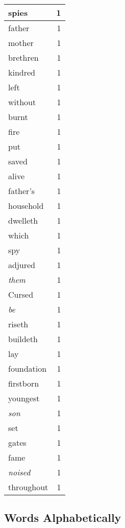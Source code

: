 \begin{center}
\begin{longtable}{l|r}
spies & 1 \\ \hline
father & 1 \\ \hline
mother & 1 \\ \hline
brethren & 1 \\ \hline
kindred & 1 \\ \hline
left & 1 \\ \hline
without & 1 \\ \hline
burnt & 1 \\ \hline
fire & 1 \\ \hline
put & 1 \\ \hline
saved & 1 \\ \hline
alive & 1 \\ \hline
father's & 1 \\ \hline
household & 1 \\ \hline
dwelleth & 1 \\ \hline
which & 1 \\ \hline
spy & 1 \\ \hline
adjured & 1 \\ \hline
\emph{them} & 1 \\ \hline
Cursed & 1 \\ \hline
\emph{be} & 1 \\ \hline
riseth & 1 \\ \hline
buildeth & 1 \\ \hline
lay & 1 \\ \hline
foundation & 1 \\ \hline
firstborn & 1 \\ \hline
youngest & 1 \\ \hline
\emph{son} & 1 \\ \hline
set & 1 \\ \hline
gates & 1 \\ \hline
fame & 1 \\ \hline
\emph{noised} & 1 \\ \hline
throughout & 1 \\ \hline
\end{longtable}
\end{center}



\normalsize



\subsection{Words Alphabetically}

